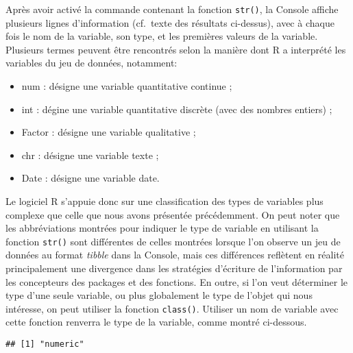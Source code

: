 \documentclass[
]{book}
\newenvironment{Shaded}{\begin{snugshade}}{\end{snugshade}}
\newcommand{\AttributeTok}[1]{\textcolor[rgb]{0.77,0.63,0.00}{#1}}
\newcommand{\FunctionTok}[1]{\textcolor[rgb]{0.00,0.00,0.00}{#1}}
\newcommand{\NormalTok}[1]{#1}
\newcommand{\SpecialCharTok}[1]{\textcolor[rgb]{0.00,0.00,0.00}{#1}}
\providecommand{\tightlist}{%
  \setlength{\itemsep}{0pt}\setlength{\parskip}{0pt}}
\begin{document}
Après avoir activé la commande contenant la fonction \texttt{str()}, la Console affiche plusieurs lignes d'information (cf.~texte des résultats ci-dessus), avec à chaque fois le nom de la variable, son type, et les premières valeurs de la variable. Plusieurs termes peuvent être rencontrés selon la manière dont R a interprété les variables du jeu de données, notamment:

\begin{itemize}
\tightlist
\item
  num : désigne une variable quantitative continue ;
\item
  int : dégine une variable quantitative discrète (avec des nombres entiers) ;
\item
  Factor : désigne une variable qualitative ;
\item
  chr : désigne une variable texte ;
\item
  Date : désigne une variable date.
\end{itemize}

Le logiciel R s'appuie donc sur une classification des types de variables plus complexe que celle que nous avons présentée précédemment. On peut noter que les abbréviations montrées pour indiquer le type de variable en utilisant la fonction \texttt{str()} sont différentes de celles montrées lorsque l'on observe un jeu de données au format \emph{tibble} dans la Console, mais ces différences reflètent en réalité principalement une divergence dans les stratégies d'écriture de l'information par les concepteurs des packages et des fonctions. En outre, si l'on veut déterminer le type d'une seule variable, ou plus globalement le type de l'objet qui nous intéresse, on peut utiliser la fonction \texttt{class()}. Utiliser un nom de variable avec cette fonction renverra le type de la variable, comme montré ci-dessous.

\begin{Shaded}
\end{Shaded}

\begin{verbatim}
## [1] "numeric"
\end{verbatim}
\end{document}
